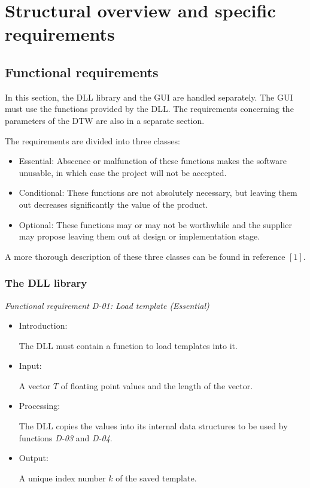 \documentclass[a4paper,11pt]{article}
\begin{document}
\section{Structural overview and specific requirements}

\subsection{Functional requirements} 
\label{sec:funcreq}

In this section, the DLL library and the GUI are handled separately. The GUI must use the functions provided by 
the DLL. The requirements concerning the parameters of the DTW are also in a separate section.

The requirements are divided into three classes:
\begin{itemize}
\item Essential: Abscence or malfunction of these functions makes the software unusable, in which case the project will not be accepted. 
\item Conditional: These functions are not absolutely necessary, but leaving them out decreases significantly the value of the
product.
\item Optional: These functions may or may not be worthwhile and the supplier may propose leaving them out at design
or implementation stage.
\end{itemize}

A more thorough description of these three classes can be found in reference $[1]$.

\subsubsection{The DLL library}

\noindent \emph{Functional requirement D-01: Load template (Essential)}
\begin{itemize}
\item Introduction:

The DLL must contain a function to load templates into it.

\item Input:

A vector $T$ of floating point values and the length of the vector.

\item Processing:

The DLL copies the values into its internal data structures to be used by functions \emph{D-03} and \emph{D-04}.

\item Output:

A unique index number $k$ of the saved template.
\end{itemize}
\end{document}
